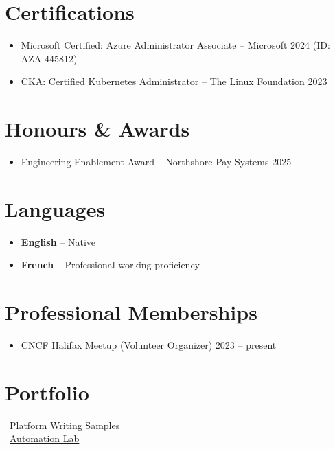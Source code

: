 \documentclass[10pt]{article}
\begin{document}
\section*{Certifications}
\begin{itemize}[nosep,leftmargin=*]
    \item Microsoft Certified: Azure Administrator Associate -- Microsoft \hfill 2024
         (ID: AZA-445812)
    \item CKA: Certified Kubernetes Administrator -- The Linux Foundation \hfill 2023
\end{itemize}

\section*{Honours \& Awards}
\begin{itemize}[nosep,leftmargin=*]
    \item Engineering Enablement Award -- Northshore Pay Systems \hfill 2025
\end{itemize}

\section*{Languages}
\begin{itemize}
    \item \textbf{English} -- Native
    \item \textbf{French} -- Professional working proficiency
\end{itemize}

\section*{Professional Memberships}
\begin{itemize}[nosep,leftmargin=*]
    \item CNCF Halifax Meetup (Volunteer Organizer) \hfill 2023 -- present
\end{itemize}

\section*{Portfolio}
~\href{https://example.test/jimbo-writing}{Platform Writing Samples}\\
~\href{https://github.com/jimbocalder/automation-lab}{Automation Lab}\\
\end{document}
